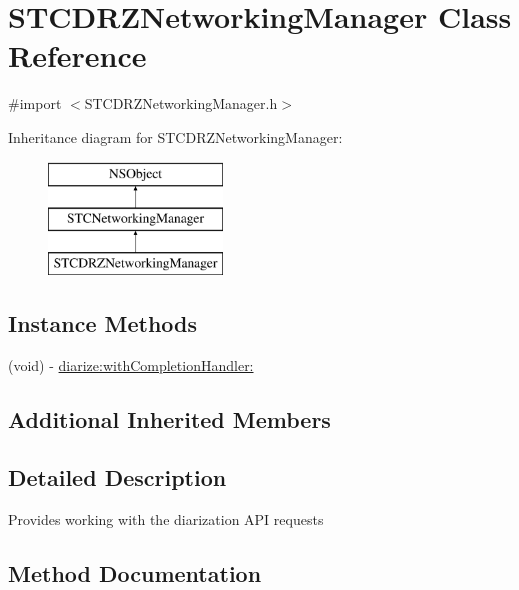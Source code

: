 \hypertarget{interface_s_t_c_d_r_z_networking_manager}{}\section{S\+T\+C\+D\+R\+Z\+Networking\+Manager Class Reference}
\label{interface_s_t_c_d_r_z_networking_manager}


{\ttfamily \#import $<$S\+T\+C\+D\+R\+Z\+Networking\+Manager.\+h$>$}

Inheritance diagram for S\+T\+C\+D\+R\+Z\+Networking\+Manager\+:\begin{figure}[H]
\begin{center}
\leavevmode
\includegraphics[height=3.000000cm]{interface_s_t_c_d_r_z_networking_manager}
\end{center}
\end{figure}
\subsection*{Instance Methods}
\begin{DoxyCompactItemize}
\item 
(void) -\/ \hyperlink{interface_s_t_c_d_r_z_networking_manager_ae8876bc26da37b8e3c12a192f0b06da4}{diarize\+:with\+Completion\+Handler\+:}
\end{DoxyCompactItemize}
\subsection*{Additional Inherited Members}


\subsection{Detailed Description}
Provides working with the diarization A\+PI requests 

\subsection{Method Documentation}
\hypertarget{interface_s_t_c_d_r_z_networking_manager_ae8876bc26da37b8e3c12a192f0b06da4}{}\label{interface_s_t_c_d_r_z_networking_manager_ae8876bc26da37b8e3c12a192f0b06da4} 
